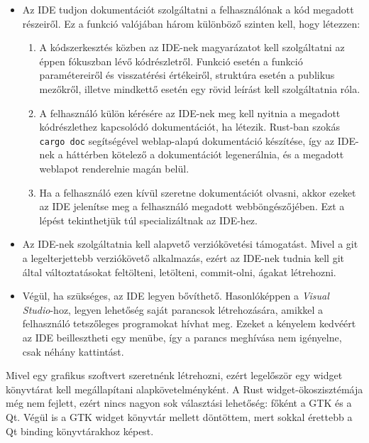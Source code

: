 \begin{itemize}
	\item Az IDE tudjon dokumentációt szolgáltatni a felhasználónak a kód megadott részeiről. 
	Ez a funkció valójában három különböző szinten kell, hogy létezzen:
	\begin{enumerate}
		\item A kódszerkesztés közben az IDE-nek magyarázatot kell szolgáltatni az éppen fókuszban lévő kódrészletről. 
		Funkció esetén a funkció paramétereiről és visszatérési értékeiről, struktúra esetén a publikus mezőkről, illetve mindkettő esetén egy rövid leírást kell szolgáltatnia róla.
		
		\item A felhasználó külön kérésére az IDE-nek meg kell nyitnia a megadott kódrészlethez kapcsolódó dokumentációt, ha létezik. 
		Rust-ban szokás \texttt{cargo doc} segítségével weblap-alapú dokumentáció készítése, így az IDE-nek a háttérben kötelező a dokumentációt legenerálnia, és a megadott weblapot renderelnie magán belül.
		
		\item Ha a felhasználó ezen kívül szeretne dokumentációt olvasni, akkor ezeket az IDE jelenítse meg a felhasználó megadott webböngészőjében. 
		Ezt a lépést tekinthetjük túl specializáltnak az IDE-hez.
	\end{enumerate}
	
	\item Az IDE-nek szolgáltatnia kell alapvető verziókövetési támogatást. 
	Mivel a git a legelterjettebb verziókövető alkalmazás, ezért az IDE-nek tudnia kell git által változtatásokat feltölteni, letölteni, commit-olni, ágakat létrehozni.
	
	\item Végül, ha szükséges, az IDE legyen bővíthető. 
	Hasonlóképpen a \emph{Visual Studio}-hoz, legyen lehetőség saját parancsok létrehozására, amikkel a felhasználó tetszőleges programokat hívhat meg. 
	Ezeket a kényelem kedvéért az IDE beillesztheti egy menübe, így a parancs meghívása nem igényelne, csak néhány kattintást.
\end{itemize}



Mivel egy grafikus szoftvert szeretnénk létrehozni, ezért legelőször egy widget könyvtárat kell megállapítani alapkövetelményként.
A Rust widget-ökoszisztémája még nem fejlett, ezért nincs nagyon sok választási lehetőség: főként a GTK és a Qt.
Végül is a GTK widget könyvtár mellett döntöttem, mert sokkal érettebb a Qt binding könyvtárakhoz képest.


